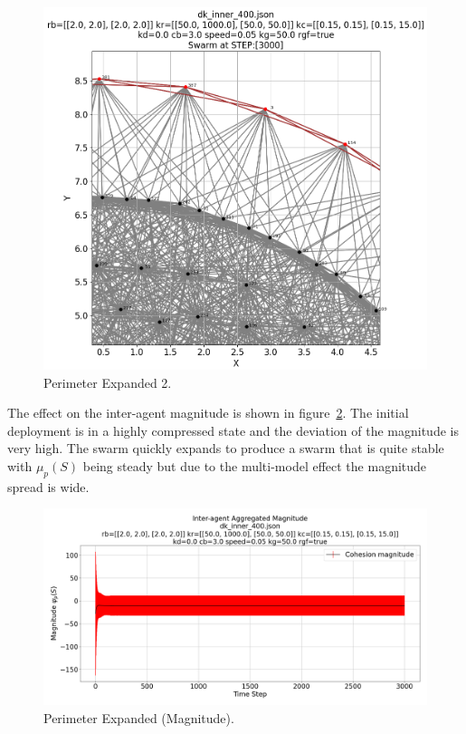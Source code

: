 \documentclass[12pt,a4paper]{IEEEtran}
\begin{document}
\begin{figure}[H]
	\begin{center}
		\includegraphics[width=1.0\linewidth]{figures/inner2}
	\end{center}
	\caption{Perimeter Expanded 2. \label{fig:perimExpand2}}
\end{figure}

The effect on the inter-agent magnitude is shown in figure~\ref{fig:perimExpandMagnitude}. The initial deployment is in a highly compressed state and the deviation of the magnitude is very high. The swarm quickly expands to produce a swarm that is quite stable with $\mu_p(S)$ being steady but due to the multi-model effect the magnitude spread is wide.

\begin{figure}[H]
	\begin{center}
		\includegraphics[width=1.0\linewidth]{figures/innerMagnitude}
	\end{center}
	\caption{Perimeter Expanded (Magnitude). \label{fig:perimExpandMagnitude}}
\end{figure}
\end{document}
